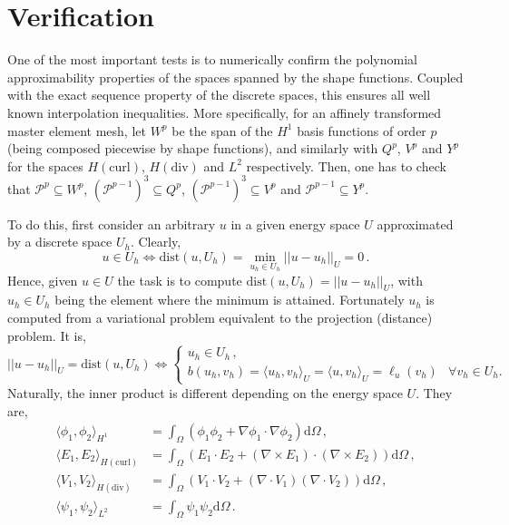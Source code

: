 \section{Verification}
\label{app:verification}


One of the most important tests is to numerically confirm the polynomial approximability properties of the spaces spanned by the shape functions.
Coupled with the exact sequence property of the discrete spaces, this ensures all well known interpolation inequalities.
More specifically, for an affinely transformed master element mesh, let $W^p$ be the span of the $H^1$ basis functions of order $p$ (being composed piecewise by shape functions), and similarly with $Q^p$, $V^p$ and $Y^p$ for the spaces $H(\mathrm{curl})$, $H(\mathrm{div})$ and $L^2$ respectively.
Then, one has to check that $\mathcal{P}^p\subseteq W^p$, $(\mathcal{P}^{p-1})^3\subseteq Q^p$, $(\mathcal{P}^{p-1})^3\subseteq V^p$ and $\mathcal{P}^{p-1}\subseteq Y^p$.

To do this, first consider an arbitrary $u$ in a given energy space $U$ approximated by a discrete space $U_h$.
Clearly,
\begin{equation}
	u\in U_h \Leftrightarrow \mathrm{dist}(u,U_h)=\min_{u_h\in U_h}||u-u_h||_U=0\,.
\end{equation}
Hence, given $u\in U$ the task is to compute $\mathrm{dist}(u,U_h)=||u-u_h||_U$, with $u_h\in U_h$ being the element where the minimum is attained.
Fortunately $u_h$ is computed from a variational problem equivalent to the projection (distance) problem.
It is,
\begin{equation}
	||u-u_h||_U=\mathrm{dist}(u,U_h)\Leftrightarrow
		\begin{cases}
			u_h\in U_h\,,&{}\\
			b(u_h,v_h)=\langle u_h,v_h \rangle_U=\langle u,v_h \rangle_U=\ell_u(v_h)& \forall v_h\in U_h.
		\end{cases}
	\label{eq:variationalprojection}
\end{equation}
Naturally, the inner product is different depending on the energy space $U$.
They are,
\begin{equation}
  \begin{aligned}
	  \langle \phi_1,\phi_2\rangle_{H^1}&=\int_\Omega (\phi_1\phi_2+\nabla\phi_1\cdot\nabla\phi_2)\mathrm{d}\Omega\,,\\
	  \langle E_1,E_2\rangle_{H(\mathrm{curl})}&=\int_\Omega (E_1\cdot E_2+(\nabla\times E_1)\cdot(\nabla\times E_2))\mathrm{d}\Omega\,,\\
		\langle V_1,V_2\rangle_{H(\mathrm{div})}&=\int_\Omega (V_1\cdot V_2+(\nabla\cdot V_1)(\nabla\cdot V_2))\mathrm{d}\Omega\,,\\
		\langle \psi_1,\psi_2\rangle_{L^2}&=\int_\Omega \psi_1\psi_2\mathrm{d}\Omega\,.
	\end{aligned}
\end{equation}

